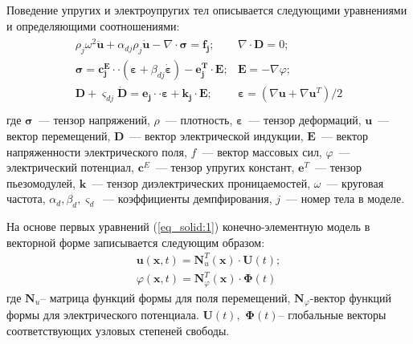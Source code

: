 Поведение упругих и электроупругих тел описывается следующими уравнениями и определяющими соотношениями:
\begin{equation} \label{eq_solid:1}  
\begin{aligned} 
	\begin{array}{ll} 
		\rho_{j} \omega^2 \boldsymbol{\ddot u}+\alpha_{dj}\rho_j\boldsymbol{\dot u}-\nabla \cdot \boldsymbol{\sigma} =\boldsymbol{f_{j}}; & \nabla \cdot \boldsymbol{D}={0};\\ 
		\boldsymbol{\sigma} =\boldsymbol{c_{j}^{E}} \cdot \cdot (\boldsymbol{\varepsilon}+\beta_{dj}\boldsymbol{\dot \varepsilon})-\boldsymbol{e_{j}^{T}} \cdot \boldsymbol{E}; & \boldsymbol{E}=-\nabla \varphi;\\
		\boldsymbol{D}+\varsigma_{dj}\boldsymbol{\dot {D}} =\boldsymbol{e_{j}} \cdot \cdot  \boldsymbol{\varepsilon}+\boldsymbol{k_{j}} \cdot \boldsymbol{E}; & \boldsymbol{\varepsilon} =(\nabla \boldsymbol{u}+\nabla \boldsymbol{u}^{T} )/2\\
	\end{array} 
\end{aligned}
\end{equation}
где
$\boldsymbol{\sigma}$~--- тензор напряжений,
$\rho$~--- плотность, 
$\boldsymbol{\varepsilon}$~--- тензор деформаций,
$\boldsymbol{u}$~--- вектор перемещений,
$\boldsymbol{D}$~--- вектор электрической индукции,
$\boldsymbol{E}$~--- вектор напряженности электрического поля,
$f$~--- вектор массовых сил,
$\varphi$~--- электрический потенциал,
$\boldsymbol{c}^{E}$~--- тензор упругих констант,
$\boldsymbol{e}^{T}$~--- тензор пьезомодулей,
$\boldsymbol{k}$~--- тензор диэлектрических проницаемостей,
$\omega$~--- круговая частота,
$\alpha_d, \beta_d, \varsigma_d$~--- коэффициенты демпфирования,
$j$~--- номер тела в моделе.

На основе первых уравнений (\ref{eq_solid:1}) конечно-элементную модель в векторной форме записывается следующим образом:
\begin{equation}\label{eq:2}
\begin{aligned}  
	\boldsymbol{u}(\boldsymbol{x},t)=\boldsymbol{N}_{u}^{T}(\boldsymbol{x}) \cdot \boldsymbol{U}(t);\\
	\varphi(\boldsymbol{x},t)=\boldsymbol{N}_{\varphi }^{T}(\boldsymbol{x})\cdot \boldsymbol{\Phi}(t)
\end{aligned} 
\end{equation}
где $\boldsymbol{N}_{u}$-- матрица функций формы для поля перемещений, $\boldsymbol{N}_{\varphi }^{} $-вектор функций формы для электрического потенциала. $\boldsymbol{U}\left(t\right),\, \, \boldsymbol{\Phi} \left(t\right)$-- глобальные векторы соответствующих узловых степеней свободы.



